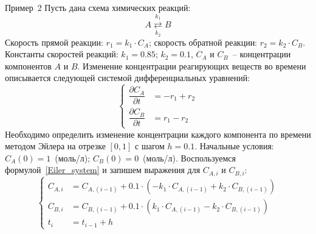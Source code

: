 \documentclass[aspectratio=169, mathserif]{beamer}	%
\begin{document}
\begin{frame}[fragile]{Пример~2}\label{slide:example2}
\scriptsize
Пусть дана схема химических реакций:
\vfill
$$
A \overset{k_1}{\underset{k_2}{\rightleftarrows}} B
$$
\vfill
Скорость прямой реакции: $r_1 = k_1 \cdot C_A$; скорость обратной реакции:
$r_2 = k_2 \cdot C_B$. Константы скоростей реакций: $k_1 = 0.85$; $k_2 = 0.1$, $C_A$ и $C_B$~-- концентрации компонентов $A$ и $B$.
Изменение концентрации реагирующих веществ во времени описывается следующей системой дифференциальных уравнений:
\vfill
\begin{equation*}
	\left\{
	\begin{aligned}
		\dfrac{\partial C_A}{\partial t} &= -r_1 + r_2 \\
		\dfrac{\partial C_B}{\partial t} &= r_1 - r_2
	\end{aligned}
	\right.
\end{equation*}
\vfill
Необходимо определить изменение концентрации каждого компонента по времени методом Эйлера на отрезке $[0, 1]$ с  шагом $h=0.1$. Начальные условия: $C_A(0) = 1$~(моль/л); $C_B(0) = 0$~(моль/л).
\vfill
Воспользуемся формулой~\eqref{Eiler_system} и запишем выражения для $C_{A,i}$ и $C_{B,i}$:
\vfill
\begin{equation*}
	\left\{
	\begin{aligned}
		C_{A, i} &= C_{A, (i-1)} + 0.1 \cdot \left(-k_1\cdot C_{A, (i-1)} + k_2 \cdot C_{B, (i-1)}\right) \\
		C_{B, i} &= C_{B, (i-1)} + 0.1 \cdot \left(k_1\cdot C_{A, (i-1)} - k_2 \cdot C_{B, (i-1)}\right) \\
		t_i &= t_{i-1} + h
	\end{aligned}
	\right.
\end{equation*}
\vfill
\end{frame}
\end{document}

